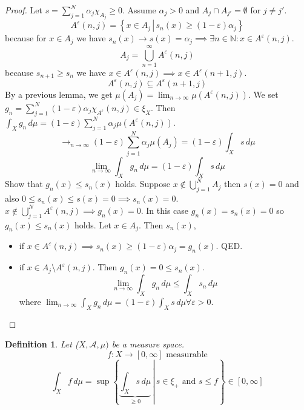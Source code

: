 \documentclass{article}
\newtheorem{definition}{Definition}  \numberwithin{definition}{section}
\newcommand{\setdef}[2]{\left\{\left.#1\,\right|\,#2\right\}}
\begin{document}
\begin{proof}
  Let $s = \sum_{j=1}^N \alpha_j \chi_{A_j} \geq 0$. Assume $\alpha_j > 0$ and $A_j \cap A_{j'} = \emptyset$ for $j \neq j'$.
  \[ A^\varepsilon(n,j) = \setdef{x \in A_j}{s_n(x) \geq (1 - \varepsilon) \alpha_j} \]
  because for $x \in A_j$ we have $s_n(x) \to s(x) = \alpha_j \implies \exists n \in \mathbb N: x \in A^\varepsilon(n,j)$.
  \[ A_j = \bigcup_{n=1}^\infty A^\varepsilon(n,j) \]
  because $s_{n+1} \geq s_n$ we have $x \in A^\varepsilon(n,j) \implies x \in A^\varepsilon(n+1,j)$.
  \[ A^\varepsilon(n,j) \subseteq A^\varepsilon(n+1,j) \]
  By a previous lemma, we get $\mu(A_j) = \lim_{n\to\infty} \mu(A^\varepsilon(n,j))$.
  We set $g_n = \sum_{j=1}^N (1 - \varepsilon) \alpha_j \chi_{A^\varepsilon}(n,j) \in \xi_X$.
  Then $\int_X g_n \, d\mu = (1 - \varepsilon) \sum_{j=1}^N \alpha_j \mu(A^\varepsilon(n,j))$.
  \[ \to_{n\to\infty} (1 - \varepsilon) \sum_{j=1}^N \alpha_j \mu(A_j) = (1 - \varepsilon) \int_X s \, d\mu \]
  \[ \lim_{n\to\infty} \int_X g_n \, d\mu = (1 - \varepsilon) \int_X s \, d\mu \]
  Show that $g_n(x) \leq s_n(x)$ holds.
  Suppose $x \not\in \bigcup_{j=1}^N A_j$ then $s(x) = 0$ and also $0 \leq s_n(x) \leq s(x) = 0 \implies s_n(x) = 0$.
  $x \not\in \bigcup_{j=1}^N A^\varepsilon(n,j) \implies g_n(x) = 0$.
  In this case $g_n(x) = s_n(x) = 0$ so $g_n(x) \leq s_n(x)$ holds.
  Let $x \in A_j$. Then $s_n(x)$,
  \begin{itemize}
  	\item if $x \in A^\varepsilon(n,j) \implies s_n(x) \geq (1 - \varepsilon) \alpha_j = g_n(x)$. QED.
  	\item if $x \in A_j \setminus A^\varepsilon(n,j)$. Then $g_n(x) = 0 \leq s_n(x)$.
  	  \[ \lim_{n\to\infty} \int_X g_n \, d\mu \leq \int_X s_n \, d\mu \]
  	  where $\lim_{n\to\infty} \int_X g_n \, d\mu = (1 - \varepsilon) \int_X s \, d\mu \forall \varepsilon > 0$.
  \end{itemize}
\end{proof}

\begin{definition}
  Let ($X, \mathcal A, \mu)$ be a measure space.
  \[ f: X \to [0, \infty] \text{ measurable} \]
  \[ \int_X f \, d\mu = \sup\setdef{\underbrace{\int_X s \, d\mu}_{\geq 0}}{s \in \xi_+ \text{ and } s \leq f}  \in [0,\infty] \]
\end{definition}
\end{document}

